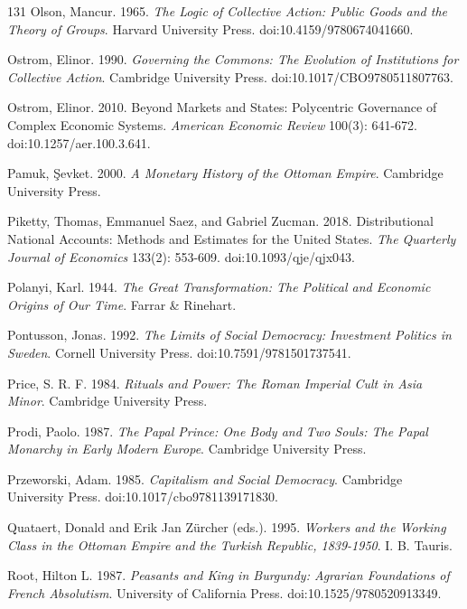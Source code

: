 \documentclass[11pt,letterpaper]{article}
\theoremstyle{definition}
\theoremstyle{remark}
\begin{document}
\begin{thebibliography}{131}
Olson, Mancur. 1965. \emph{The Logic of Collective Action: Public Goods and the Theory of Groups}. Harvard University Press. doi:10.4159/9780674041660.

Ostrom, Elinor. 1990. \emph{Governing the Commons: The Evolution of Institutions for Collective Action}. Cambridge University Press. doi:10.1017/CBO9780511807763.

Ostrom, Elinor. 2010. Beyond Markets and States: Polycentric Governance of Complex Economic Systems. \emph{American Economic Review} 100(3): 641-672. doi:10.1257/aer.100.3.641.

Pamuk, \c{S}evket. 2000. \emph{A Monetary History of the Ottoman Empire}. Cambridge University Press.

Piketty, Thomas, Emmanuel Saez, and Gabriel Zucman. 2018. Distributional National Accounts: Methods and Estimates for the United States. \emph{The Quarterly Journal of Economics} 133(2): 553-609. doi:10.1093/qje/qjx043.

Polanyi, Karl. 1944. \emph{The Great Transformation: The Political and Economic Origins of Our Time}. Farrar \& Rinehart.

Pontusson, Jonas. 1992. \emph{The Limits of Social Democracy: Investment Politics in Sweden}. Cornell University Press. doi:10.7591/9781501737541.

Price, S. R. F. 1984. \emph{Rituals and Power: The Roman Imperial Cult in Asia Minor}. Cambridge University Press.

Prodi, Paolo. 1987. \emph{The Papal Prince: One Body and Two Souls: The Papal Monarchy in Early Modern Europe}. Cambridge University Press.

Przeworski, Adam. 1985. \emph{Capitalism and Social Democracy}. Cambridge University Press. doi:10.1017/cbo9781139171830.

Quataert, Donald and Erik Jan Z\"urcher (eds.). 1995. \emph{Workers and the Working Class in the Ottoman Empire and the Turkish Republic, 1839-1950}. I. B. Tauris.

Root, Hilton L. 1987. \emph{Peasants and King in Burgundy: Agrarian Foundations of French Absolutism}. University of California Press. doi:10.1525/9780520913349.


\end{thebibliography}
\end{document}
